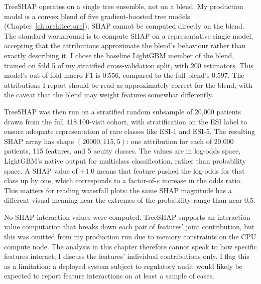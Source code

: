 TreeSHAP operates on a single tree ensemble, not on a blend. My production model is a convex blend of five gradient-boosted tree models (Chapter~\ref{ch:architecture}); SHAP cannot be computed directly on the blend. The standard workaround is to compute SHAP on a representative single model, accepting that the attributions approximate the blend's behaviour rather than exactly describing it. I chose the baseline LightGBM member of the blend, trained on fold 5 of my stratified cross-validation split, with $200$ estimators. This model's out-of-fold macro F1 is $0.556$, compared to the full blend's $0.597$. The attributions I report should be read as approximately correct for the blend, with the caveat that the blend may weight features somewhat differently.

TreeSHAP was then run on a stratified random subsample of 20,000 patients drawn from the full 418,100-visit cohort, with stratification on the ESI label to ensure adequate representation of rare classes like ESI-1 and ESI-5. The resulting SHAP array has shape $(20000, 115, 5)$: one attribution for each of 20,000 patients, 115 features, and 5 acuity classes. The values are in log-odds space, LightGBM's native output for multiclass classification, rather than probability space. A SHAP value of $+1.0$ means that feature pushed the log-odds for that class up by one, which corresponds to a factor-of-$e$ increase in the odds ratio. This matters for reading waterfall plots: the same SHAP magnitude has a different visual meaning near the extremes of the probability range than near 0.5.

No SHAP interaction values were computed. TreeSHAP supports an interaction-value computation that breaks down each pair of features' joint contribution, but this was omitted from my production run due to memory constraints on the CPU compute node. The analysis in this chapter therefore cannot speak to how specific features interact; I discuss the features' individual contributions only. I flag this as a limitation: a deployed system subject to regulatory audit would likely be expected to report feature interactions on at least a sample of cases.

